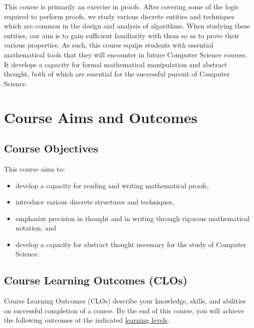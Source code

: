 \documentclass[a4paper]{article}
\begin{document}
This course is primarily an exercise in proofs. After covering some of the logic required to perform proofs, we study various discrete entities and techniques which are common in the design and analysis of algorithms.  When studying these entities, our aim is to gain sufficient familiarity with them so as to prove their various properties. As such, this course equips students with essential mathematical tools that they will encounter in future Computer Science courses.  It develops a capacity for formal mathematical manipulation and abstract thought, both of which are essential for the successful pursuit of Computer Science.

\section{Course Aims and Outcomes}

\subsection{Course Objectives}

This course aims to:
\begin{itemize}
\item develop a capacity for reading and writing mathematical proofs,
\item introduce various discrete structures and techniques,
\item emphasize precision in thought and in writing through rigorous mathematical notation, and
\item develop a capacity for abstract thought necessary for the study of Computer Science.
\end{itemize}

\subsection{Course Learning Outcomes (CLOs)}

Course Learning Outcomes (CLOs) describe your knowledge, skills, and abilities on successful completion of a course. By the end of this course, you will achieve the following outcomes at the indicated \href{https://educerecentre.com/what-are-the-three-domains-of-blooms-taxonomy/}{learning levels}.
\end{document}
